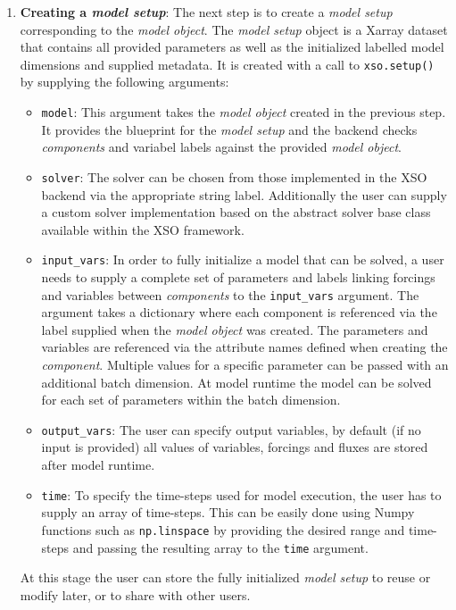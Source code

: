 \documentclass[journal abbreviation, manuscript]{copernicus}
\begin{document}
\begin{enumerate}
    \item \textbf{Creating a \textit{model setup}}: 
    The next step is to create a \textit{model setup} corresponding to the \textit{model object}.
    The \textit{model setup} object is a Xarray dataset that contains all provided parameters as well as the initialized labelled model dimensions and supplied metadata. It is created with a call to \texttt{xso.setup()} by supplying the following arguments:
    \begin{itemize}
        \item \texttt{model}: This argument takes the \textit{model object} created in the previous step. It provides the blueprint for the \textit{model setup} and the backend checks \textit{components} and variabel labels against the provided \textit{model object}.
        \item \texttt{solver}: The solver can be chosen from those implemented in the XSO backend via the appropriate string label. Additionally the user can supply a custom solver implementation based on the abstract solver base class available within the XSO framework.
        \item \texttt{input\_vars}:
        In order to fully initialize a model that can be solved, a user needs to supply a complete set of parameters and labels linking forcings and variables between \textit{components} to the \texttt{input\_vars} argument. The argument takes a dictionary where each component is referenced via the label supplied when the \textit{model object} was created. The parameters and variables are referenced via the attribute names defined when creating the \textit{component}. Multiple values for a specific parameter can be passed with an additional batch dimension. At model runtime the model can be solved for each set of parameters within the batch dimension.
        \item \texttt{output\_vars}: The user can specify output variables, by default (if no input is provided) all values of variables, forcings and fluxes are stored after model runtime.
        \item \texttt{time}: To specify the time-steps used for model execution, the user has to supply an array of time-steps. This can be easily done using Numpy functions such as \texttt{np.linspace} by providing the desired range and time-steps and passing the resulting array to the \texttt{time} argument.
    \end{itemize}
    At this stage the user can store the fully initialized \textit{model setup} to reuse or modify later, or to share with other users.
    

\end{enumerate}
\end{document}
